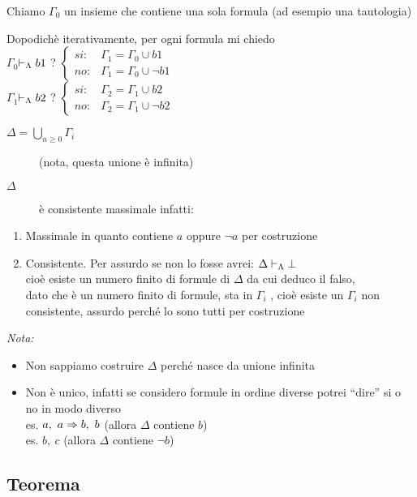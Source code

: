 Chiamo $\Gamma_{0}$ un insieme che contiene una sola formula (ad
esempio una tautologia)

Dopodichè iterativamente, per ogni formula mi chiedo\\


$\Gamma_{0}$$\vdash_{\Lambda}b1$ ? $\begin{cases}
si: & \Gamma_{1}=\Gamma_{0}\cup b1\\
no: & \Gamma_{1}=\Gamma_{0}\cup\neg b1
\end{cases}$\\


$\Gamma_{1}$$\vdash_{\Lambda}b2$ ? $\begin{cases}
si: & \Gamma_{2}=\Gamma_{1}\cup b2\\
no: & \Gamma_{2}=\Gamma_{1}\cup\neg b2
\end{cases}$ 
\begin{description}
\item [{$\Delta=\bigcup_{n\geq0}\Gamma_{i}$}] (nota, questa unione è infinita) 
\item [{$\Delta$}] è consistente massimale infatti:\end{description}
\begin{enumerate}
\item Massimale in quanto contiene $a$ oppure $\neg a$ per costruzione 
\item Consistente. Per assurdo se non lo fosse avrei: $\Delta\vdash_{\Lambda}\bot$\\
 cioè esiste un numero finito di formule di $\Delta$ da cui deduco
il falso,\\
 dato che è un numero finito di formule, sta in $\Gamma_{i}$ , cioè
esiste un $\Gamma_{i}$ non consistente, assurdo perché lo sono tutti
per costruzione \lightning 
\end{enumerate}
\emph{\large{{Nota:}}}{\large \par}

 
\begin{itemize}
\item Non sappiamo costruire $\Delta$ perché nasce da unione infinita 
\item Non è unico, infatti se considero formule in ordine diverse potrei
``dire'' si o no in modo diverso \\
 es. $a,\ a\Rightarrow b,\ b$ (allora $\Delta$ contiene $b$)\\
 es. $b,\ c$ (allora $\Delta$ contiene $\neg b$) 
\end{itemize}

\subsection{Teorema}

